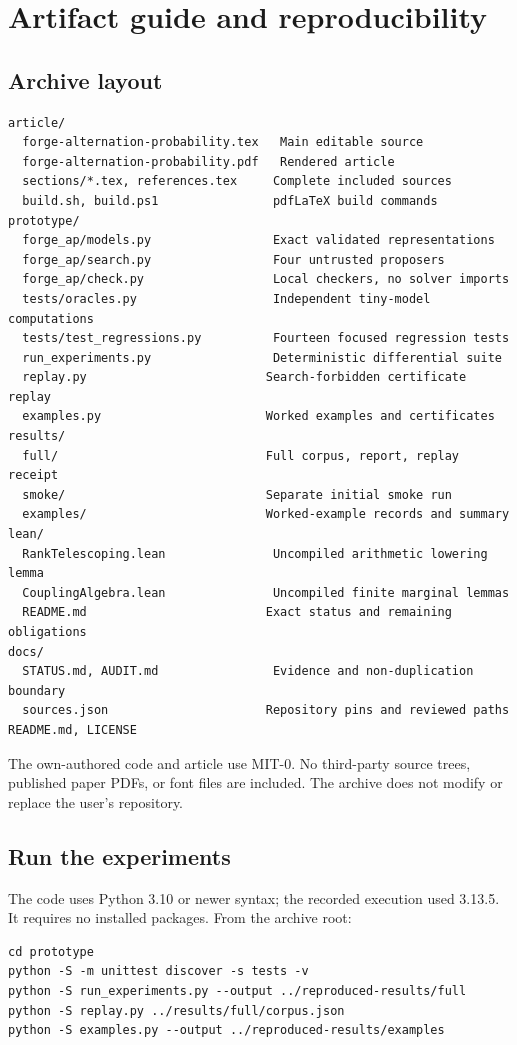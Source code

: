 \section{Artifact guide and reproducibility}
\label{app:artifacts}

\subsection{Archive layout}

\begin{lstlisting}
article/
  forge-alternation-probability.tex   Main editable source
  forge-alternation-probability.pdf   Rendered article
  sections/*.tex, references.tex     Complete included sources
  build.sh, build.ps1                pdfLaTeX build commands
prototype/
  forge_ap/models.py                 Exact validated representations
  forge_ap/search.py                 Four untrusted proposers
  forge_ap/check.py                  Local checkers, no solver imports
  tests/oracles.py                   Independent tiny-model computations
  tests/test_regressions.py          Fourteen focused regression tests
  run_experiments.py                 Deterministic differential suite
  replay.py                         Search-forbidden certificate replay
  examples.py                       Worked examples and certificates
results/
  full/                             Full corpus, report, replay receipt
  smoke/                            Separate initial smoke run
  examples/                         Worked-example records and summary
lean/
  RankTelescoping.lean               Uncompiled arithmetic lowering lemma
  CouplingAlgebra.lean               Uncompiled finite marginal lemmas
  README.md                         Exact status and remaining obligations
docs/
  STATUS.md, AUDIT.md                Evidence and non-duplication boundary
  sources.json                      Repository pins and reviewed paths
README.md, LICENSE
\end{lstlisting}

The own-authored code and article use MIT-0. No third-party source trees,
published paper PDFs, or font files are included. The archive does not modify
or replace the user's repository.

\subsection{Run the experiments}

The code uses Python 3.10 or newer syntax; the recorded execution used 3.13.5.
It requires no installed packages. From the archive root:
\begin{lstlisting}
cd prototype
python -S -m unittest discover -s tests -v
python -S run_experiments.py --output ../reproduced-results/full
python -S replay.py ../results/full/corpus.json
python -S examples.py --output ../reproduced-results/examples
\end{lstlisting}

